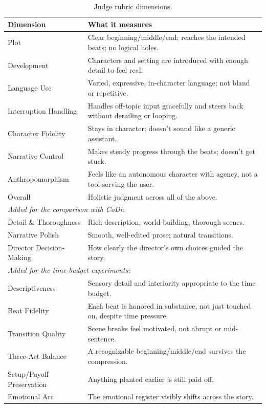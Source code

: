 \begin{table}[htbp]
\centering
\caption{Judge rubric dimensions.}
\label{tab:rubric}
\small
\begin{tabular}{p{3.3cm}p{10.5cm}}
\toprule
Dimension & What it measures \\
\midrule
Plot & Clear beginning/middle/end; reaches the intended beats; no logical holes. \\
Development & Characters and setting are introduced with enough detail to feel real. \\
Language Use & Varied, expressive, in-character language; not bland or repetitive. \\
Interruption Handling & Handles off-topic input gracefully and steers back without derailing or looping. \\
Character Fidelity & Stays in character; doesn't sound like a generic assistant. \\
Narrative Control & Makes steady progress through the beats; doesn't get stuck. \\
Anthropomorphism & Feels like an autonomous character with agency, not a tool serving the user. \\
Overall & Holistic judgment across all of the above. \\
\midrule
\multicolumn{2}{l}{\textit{Added for the comparison with CoDi:}} \\
Detail \& Thoroughness & Rich description, world-building, thorough scenes. \\
Narrative Polish & Smooth, well-edited prose; natural transitions. \\
Director Decision-Making & How clearly the director's own choices guided the story. \\
\midrule
\multicolumn{2}{l}{\textit{Added for the time-budget experiments:}} \\
Descriptiveness & Sensory detail and interiority appropriate to the time budget. \\
Beat Fidelity & Each beat is honored in substance, not just touched on, despite time pressure. \\
Transition Quality & Scene breaks feel motivated, not abrupt or mid-sentence. \\
Three-Act Balance & A recognizable beginning/middle/end survives the compression. \\
Setup/Payoff Preservation & Anything planted earlier is still paid off. \\
Emotional Arc & The emotional register visibly shifts across the story. \\
\bottomrule
\end{tabular}
\end{table}

